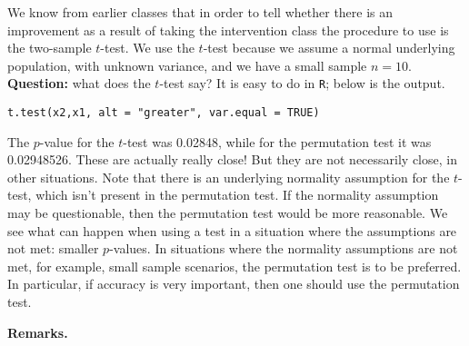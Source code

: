 \documentclass[captions=tableheading]{scrbook}
\begin{document}
We know from earlier classes that in order to tell whether there is an improvement as a result of taking the intervention class the procedure to use is the two-sample $t$-test. We use the $t$-test because we assume a normal underlying population, with unknown variance, and we have a small sample $n=10$. \textbf{Question:} what does the $t$-test say? It is easy to do in \texttt{R}; below is the output.

\begin{verbatim}
t.test(x2,x1, alt = "greater", var.equal = TRUE)
\end{verbatim}


The $p$-value for the $t$-test was 0.02848, while for the permutation test it was 0.02948526. These are actually really close! But they are not necessarily close, in other situations. Note that there is an underlying normality assumption for the $t$-test, which isn't present in the permutation test. If the normality assumption may be questionable, then the permutation test would be more reasonable. We see what can happen when using a test in a situation where the assumptions are not met: smaller $p$-values. In situations where the normality assumptions are not met, for example, small sample scenarios, the permutation test is to be preferred. In particular, if accuracy is very important, then one should use the permutation test.

 
\textbf{Remarks.}
\end{document}
